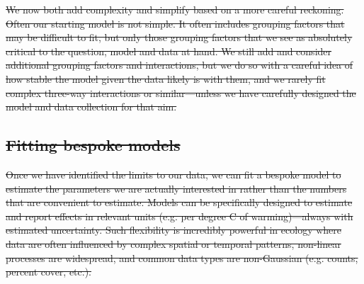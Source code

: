 \documentclass[11pt]{article}
\providecommand{\DIFdeltex}[1]{{\protect\color{red}\sout{#1}}}                      %
\providecommand{\DIFdelbegin}{} %
\providecommand{\DIFdelend}{} %
\providecommand{\DIFdel}[1]{\texorpdfstring{\DIFdeltex{#1}}{}} %
\newcommand{\DIFscaledelfig}{0.5}
\newlength{\DIFdelgraphicswidth} %
\newlength{\DIFdelgraphicsheight} %
\newcommand{\DIFdelincludegraphics}[2][]{%
\sbox{\DIFdelgraphicsbox}{\DIFOincludegraphics[#1]{#2}}%
\settoboxwidth{\DIFdelgraphicswidth}{\DIFdelgraphicsbox} %
\settoboxtotalheight{\DIFdelgraphicsheight}{\DIFdelgraphicsbox} %
\scalebox{\DIFscaledelfig}{%
\parbox[b]{\DIFdelgraphicswidth}{\usebox{\DIFdelgraphicsbox}\\[-\baselineskip] \rule{\DIFdelgraphicswidth}{0em}}\llap{\resizebox{\DIFdelgraphicswidth}{\DIFdelgraphicsheight}{%
\setlength{\unitlength}{\DIFdelgraphicswidth}%
\begin{picture}(1,1)%
\thicklines\linethickness{2pt} %
{\color[rgb]{1,0,0}\put(0,0){\framebox(1,1){}}}%
{\color[rgb]{1,0,0}\put(0,0){\line( 1,1){1}}}%
{\color[rgb]{1,0,0}\put(0,1){\line(1,-1){1}}}%
\end{picture}%
}\hspace*{3pt}}} %
} %
\DeclareRobustCommand{\DIFdelbegin}{\DIFOdelbegin \let\includegraphics\DIFdelincludegraphics} %
\DeclareRobustCommand{\DIFdelend}{\DIFOaddend \let\includegraphics\DIFOincludegraphics} %
\begin{document}
\DIFdelbegin \DIFdel{We now both add complexity and simplify based on a more careful reckoning. Often our starting model is not simple.  It often includes grouping factors that may be difficult to fit, but only those grouping factors that we see as absolutely critical to the question, model and data at hand. We still add and consider additional grouping factors and interactions, but we do so with a careful idea of how stable the model given the data likely is with them, and we rarely fit complex three-way interactions or similar---unless we have carefully designed the model and data collection for that aim. 
}\DIFdelend %

\DIFdelbegin \subsection*{\DIFdel{Fitting bespoke models}} 
\DIFdel{Once we have identified the limits to our data, we can fit a bespoke model to estimate the parameters we are actually interested in rather than the numbers that are convenient to estimate. Models can be specifically designed to estimate and report effects in relevant units (e.g. per degree C of warming)---always with estimated uncertainty. Such flexibility is incredibly powerful in ecology where data are often influenced by complex spatial or temporal patterns, non-linear processes are widespread, and common data types are non-Gaussian (e.g. counts, percent cover, etc.). 
}%
\end{document}
